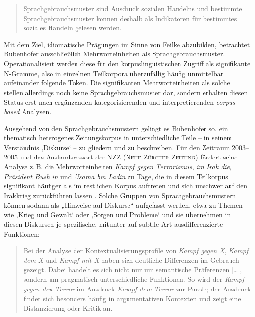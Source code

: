\begin{quote}
Sprachgebrauchsmuster sind Ausdruck sozialen Handelns und bestimmte Sprachgebrauchsmuster können deshalb als Indikatoren für bestimmtes soziales Handeln gelesen werden. \autocite[53]{bubenhoferSprachgebrauchsmusterKorpuslinguistikAls2009}
\end{quote}

Mit dem Ziel, idiomatische Prägungen im Sinne von Feilke \autocite*{feilkeSprachlicherCommonSense1993} abzubilden, betrachtet Bubenhofer ausschließlich Mehrworteinheiten als Sprachgebrauchsmuster. Operationalisiert werden diese für den korpuslinguistischen Zugriff als signifikante N-Gramme, also in einzelnen Teilkorpora überzufällig häufig unmittelbar aufeinander folgende Token. Die signifikanten Mehrworteinheiten als solche stellen allerdings noch keine Sprachgebrauchsmuster dar, sondern erhalten diesen Status erst nach ergänzenden kategorisierenden und interpretierenden \emph{corpus-based} Analysen.

Ausgehend von den Sprachgebrauchsmustern gelingt es Bubenhofer so, ein thematisch heterogenes Zeitungskorpus in unterschiedliche Teile -- in seinem Verständnis ‚Diskurse` -- zu gliedern und zu beschreiben. Für den Zeitraum 2003--2005 und das Auslandsressort der NZZ (\textsc{Neue Zürcher Zeitung}) fördert seine Analyse z.\,B. die Mehrworteinheiten \emph{Kampf gegen Terrorismus}, \emph{im Irak die}, \emph{Präsident Bush in} und \emph{Usama bin Ladin} zu Tage, die in diesem Teilkorpus signifikant häufiger als im restlichen Korpus auftreten und sich unschwer auf den Irakkrieg zurückführen lassen \autocite[209-210]{bubenhoferSprachgebrauchsmusterKorpuslinguistikAls2009}. Solche Gruppen von Sprachgebrauchsmustern können sodann als „Hinweise auf Diskurse`` \autocite[295]{bubenhoferSprachgebrauchsmusterKorpuslinguistikAls2009} aufgefasst werden, etwa zu Themen wie ‚Krieg und Gewalt` oder ‚Sorgen und Probleme` und sie übernehmen in diesen Diskursen je spezifische, mitunter auf subtile Art ausdifferenzierte Funktionen:

\begin{quote}
Bei der Analyse der Kontextualisierungsprofile von \emph{Kampf gegen X}, \emph{Kampf dem X} und \emph{Kampf mit X} haben sich deutliche Differenzen im Gebrauch gezeigt. Dabei handelt es sich nicht nur um semantische Präferenzen {[}\ldots{]}, sondern um pragmatisch unterschiedliche Funktionen. So wird der \emph{Kampf gegen den Terror} im Ausdruck \emph{Kampf dem Terror} zur Parole; der Ausdruck findet sich besonders häufig in argumentativen Kontexten und zeigt eine Distanzierung oder Kritik an. \autocite[303]{bubenhoferSprachgebrauchsmusterKorpuslinguistikAls2009}
\end{quote}

